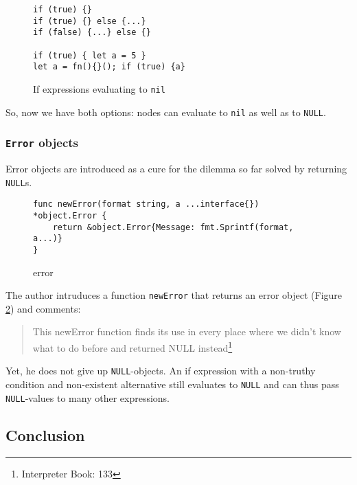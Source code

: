 \documentclass[a4paper,10pt]{article}
\begin{document}
\begin{figure}[h]
\begin{tcolorbox}\small
\begin{verbatim}
if (true) {}
if (true) {} else {...}
if (false) {...} else {}

if (true) { let a = 5 }
let a = fn(){}(); if (true) {a} 
\end{verbatim}
\end{tcolorbox}
 \caption{If expressions evaluating to {\tt nil}}
  \label{if-nil}
\end{figure}

So, now we have both options: nodes can evaluate to {\tt nil} as well as to {\tt NULL}. 




\subsubsection{{\tt Error} objects}

Error objects are introduced as a cure for the dilemma so far solved by returning {\tt NULL}s. 

\begin{figure}[h]
\begin{tcolorbox}\small
\begin{verbatim}
func newError(format string, a ...interface{}) *object.Error {
    return &object.Error{Message: fmt.Sprintf(format, a...)}
}
\end{verbatim}
\end{tcolorbox}
 \caption{error}
  \label{error-func}
\end{figure}


The author intruduces a function {\tt newError} that returns an error object (Figure \ref{error-func}) and 
comments:

\begin{quote}
This newError function finds its use in every place where we didn’t know what to do before and
returned NULL instead\footnote{Interpreter Book: 133}
\end{quote}

Yet, he does not give up {\tt NULL}-objects. An if expression with a non-truthy condition and non-existent alternative still evaluates to {\tt NULL} and can thus pass {\tt NULL}-values to many other expressions.

\subsection{Conclusion}
\end{document}
